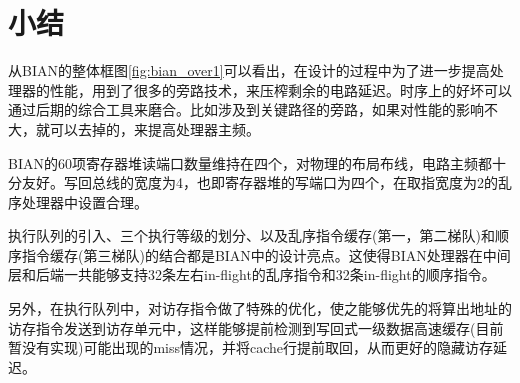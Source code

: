 \section{小结}

从BIAN的整体框图\ref{fig:bian_over1}可以看出，在设计的过程中为了进一步提高处理器的性能，用到了很多的旁路技术，来压榨剩余的电路延迟。时序上的好坏可以通过后期的综合工具来磨合。比如涉及到关键路径的旁路，如果对性能的影响不大，就可以去掉的，来提高处理器主频。

BIAN的60项寄存器堆读端口数量维持在四个，对物理的布局布线，电路主频都十分友好。写回总线的宽度为4，也即寄存器堆的写端口为四个，在取指宽度为2的乱序处理器中设置合理。

执行队列的引入、三个执行等级的划分、以及乱序指令缓存(第一，第二梯队)和顺序指令缓存(第三梯队)的结合都是BIAN中的设计亮点。这使得BIAN处理器在中间层和后端一共能够支持32条左右in-flight的乱序指令和32条in-flight的顺序指令。

另外，在执行队列中，对访存指令做了特殊的优化，使之能够优先的将算出地址的访存指令发送到访存单元中，这样能够提前检测到写回式一级数据高速缓存(目前暂没有实现)可能出现的miss情况，并将cache行提前取回，从而更好的隐藏访存延迟。
